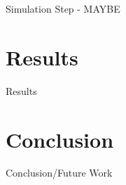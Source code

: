 \documentclass{beamer}
\begin{document}
	\begin{frame}{Simulation Step - MAYBE}
	
	
	\end{frame}

	\section{Results}
	\begin{frame}{Results}
		
		
	\end{frame}

	\section{Conclusion}
	\begin{frame}{Conclusion/Future Work}
		
	\end{frame}
		
	
\end{document}
